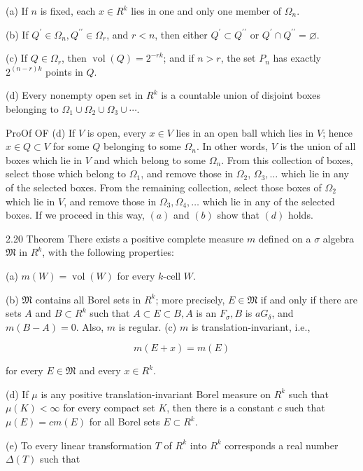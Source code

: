 \documentclass[10pt]{article}
\begin{document}
(a) If $n$ is fixed, each $x \in R^{k}$ lies in one and only one member of $\Omega_{n}$.

(b) If $Q^{\prime} \in \Omega_{n}, Q^{\prime \prime} \in \Omega_{r}$, and $r<n$, then either $Q^{\prime} \subset Q^{\prime \prime}$ or $Q^{\prime} \cap Q^{\prime \prime}=\varnothing$.

(c) If $Q \in \Omega_{r}$, then $\operatorname{vol}(Q)=2^{-r k}$; and if $n>r$, the set $P_{n}$ has exactly $2^{(n-r) k}$ points in $Q$.

(d) Every nonempty open set in $R^{k}$ is a countable union of disjoint boxes belonging to $\Omega_{1} \cup \Omega_{2} \cup \Omega_{3} \cup \cdots$.

ProOf OF (d) If $V$ is open, every $x \in V$ lies in an open ball which lies in $V$; hence $x \in Q \subset V$ for some $Q$ belonging to some $\Omega_{n}$. In other words, $V$ is the union of all boxes which lie in $V$ and which belong to some $\Omega_{n}$. From this collection of boxes, select those which belong to $\Omega_{1}$, and remove those in $\Omega_{2}$, $\Omega_{3}, \ldots$ which lie in any of the selected boxes. From the remaining collection, select those boxes of $\Omega_{2}$ which lie in $V$, and remove those in $\Omega_{3}, \Omega_{4}, \ldots$ which lie in any of the selected boxes. If we proceed in this way, $(a)$ and $(b)$ show that $(d)$ holds.

2.20 Theorem There exists a positive complete measure $m$ defined on a $\sigma$ algebra $\mathfrak{M}$ in $R^{k}$, with the following properties:

(a) $m(W)=\operatorname{vol}(W)$ for every $k$-cell $W$.

(b) $\mathfrak{M}$ contains all Borel sets in $R^{k}$; more precisely, $E \in \mathfrak{M}$ if and only if there are sets $A$ and $B \subset R^{k}$ such that $A \subset E \subset B, A$ is an $F_{\sigma}, B$ is $a G_{\delta}$, and $m(B-A)=0$. Also, $m$ is regular.
(c) $m$ is translation-invariant, i.e.,

$$
m(E+x)=m(E)
$$

for every $E \in \mathfrak{M}$ and every $x \in R^{k}$.

(d) If $\mu$ is any positive translation-invariant Borel measure on $R^{k}$ such that $\mu(K)<\infty$ for every compact set $K$, then there is a constant $c$ such that $\mu(E)=c m(E)$ for all Borel sets $E \subset R^{k}$.

(e) To every linear transformation $T$ of $R^{k}$ into $R^{k}$ corresponds a real number $\Delta(T)$ such that
\end{document}
